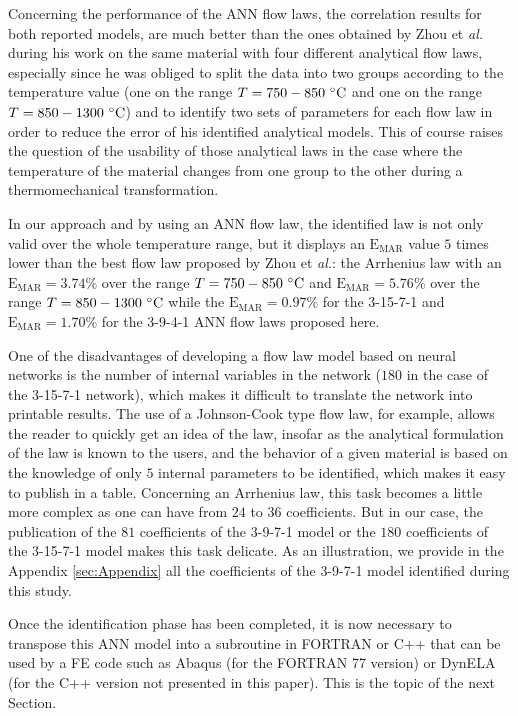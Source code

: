 \documentclass[algorithms,article,submit,pdftex,moreauthors]{Definitions/mdpi}
\makeatletter
\DeclareRobustCommand{\eal}{et \emph{al.}\@\xspace}
\DeclareRobustCommand{\MARE}{\text{E}_\text{MAR}}
\makeatother
\begin{document}
Concerning the performance of the ANN flow laws, the correlation results for both reported models, are much better than the ones obtained by Zhou \eal \cite{Zhou-2020} during his work on the same material with four different analytical flow laws, especially since he was obliged to split the data into two groups according to the temperature value (one on the range $T=750-850~\celsius$ and one on the range $T=850-1300~\celsius$) and to identify two sets of parameters for each flow law in order to reduce the error of his identified analytical models.
This of course raises the question of the usability of those analytical laws in the case where the temperature of the material changes from one group to the other during a thermomechanical transformation.

In our approach and by using an ANN flow law, the identified law is not only valid over the whole temperature range, but it displays an $\MARE$ value $5$ times lower than the best flow law proposed by Zhou \eal \cite{Zhou-2020}: the Arrhenius law with an $\MARE=3.74\%$ over the range $T=750-850~\celsius$ and $\MARE=5.76\%$ over the range $T=850-1300~\celsius$ while the $\MARE=0.97\%$ for the 3-15-7-1 and $\MARE=1.70\%$ for the 3-9-4-1 ANN flow laws proposed here.

One of the disadvantages of developing a flow law model based on neural networks is the number of internal variables in the network ($180$ in the case of the 3-15-7-1 network), which makes it difficult to translate the network into printable results.
The use of a Johnson-Cook type flow law, for example, allows the reader to quickly get an idea of the law, insofar as the analytical formulation of the law is known to the users, and the behavior of a given material is based on the knowledge of only $5$ internal parameters to be identified, which makes it easy to publish in a table.
Concerning an Arrhenius law, this task becomes a little more complex as one can have from $24$ to $36$ coefficients.
But in our case, the publication of the $81$ coefficients of the 3-9-7-1 model or the $180$ coefficients of the 3-15-7-1 model makes this task delicate.
As an illustration, we provide in the Appendix \ref{sec:Appendix} all the coefficients of the 3-9-7-1 model identified during this study.

Once the identification phase has been completed, it is now necessary to transpose this ANN model into a subroutine in FORTRAN or C++ that can be used by a FE code such as Abaqus (for the FORTRAN 77 version) or DynELA (for the C++ version not presented in this paper).
This is the topic of the next Section.
\end{document}
